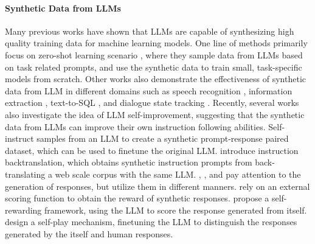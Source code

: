 \paragraph{Synthetic Data from LLMs}
Many previous works have shown that LLMs are capable of synthesizing high quality training data for machine learning models. 
One line of methods primarily focus on zero-shot learning scenario \citep{ye-etal-2022-zerogen, ye-etal-2022-progen, gao2023selfguided, meng2022generating, gupta2024targen}, where they sample data from LLMs based on task related prompts, and use the synthetic data to train small, task-specific models from scratch.
Other works also demonstrate the effectiveness of synthetic data from LLM in different domains such as speech recognition \citep{corpus-synthesis}, information extraction \citep{10.1145/3477495.3531863, josifoski-etal-2023-exploiting}, text-to-SQL \citep{yang-etal-2024-synthesizing}, and dialogue state tracking \citep{kulkarni-etal-2024-synthdst, mehri-etal-2022-lad}.
Recently, several works also investigate the idea of LLM self-improvement, suggesting that the synthetic data from LLMs can improve their own instruction following abilities.
Self-instruct \citep{wang-etal-2023-self-instruct} samples from an LLM to create a synthetic prompt-response paired dataset, which can be used to finetune the original LLM.
\citet{li2024selfalignment} introduce instruction backtranslation, which obtains synthetic instruction prompts from back-translating a web scale corpus with the same LLM.
\citet{gulcehre2023reinforced}, \citet{pmlr-v235-yuan24d}, and \citet{pmlr-v235-chen24j} pay attention to the generation of responses, but utilize them in different manners.
\citet{gulcehre2023reinforced} rely on an external scoring function to obtain the reward of synthetic responses.
\citet{pmlr-v235-yuan24d} propose a self-rewarding framework, using the LLM to score the response generated from itself.
\citet{pmlr-v235-chen24j} design a self-play mechanism, finetuning the LLM to distinguish the responses generated by the itself and human responses.
%

